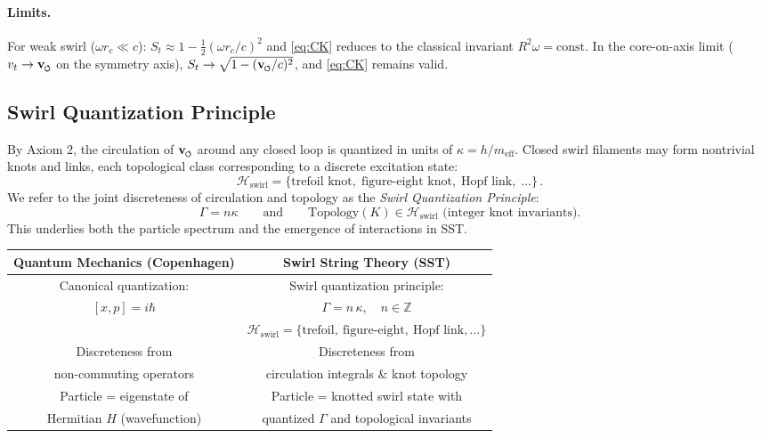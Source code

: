 \documentclass[11pt]{article}
\begin{document}
\paragraph{Limits.}
    For weak swirl ($\omega r_c\ll c$): $S_t \approx 1-\tfrac{1}{2}(\omega r_c/c)^2$ and \eqref{eq:CK} reduces to the classical invariant $R^2\omega=\text{const}$. In the core-on-axis limit ($v_t\to\vswirl$ on the symmetry axis), $S_t \to \sqrt{1-(\vswirl/c)^2}$, and \eqref{eq:CK} remains valid.

\subsection{Swirl Quantization Principle}
\label{sec:swirl_quantization}
By Axiom 2, the circulation of $\vswirl$ around any closed loop is quantized in units of $\kappa=h/m_{\text{eff}}$. Closed swirl filaments may form nontrivial knots and links, each topological class corresponding to a discrete excitation state:
\begin{equation}
\mathcal{H}_{\text{swirl}} = \{\text{trefoil knot},\; \text{figure-eight knot},\; \text{Hopf link},\;\dots\}\,.
\end{equation}
We refer to the joint discreteness of circulation and topology as the \emph{Swirl Quantization Principle}:
\[
    \Gamma = n\kappa \qquad \text{and} \qquad \text{Topology}(K)\in \mathcal{H}_{\text{swirl}} \text{ (integer knot invariants)}.
\]
This underlies both the particle spectrum and the emergence of interactions in SST.

\begin{center}\setlength{\tabcolsep}{5pt}
\begin{tabular}{|c|c|}
\hline
\textbf{Quantum Mechanics (Copenhagen)} & \textbf{Swirl String Theory (SST)} \\
\hline
Canonical quantization: & Swirl quantization principle: \\
$[x, p] = i \hbar$ & $\displaystyle \Gamma = n\,\kappa,\quad n\in\mathbb{Z}$ \\[6pt]
& $\displaystyle \mathcal{H}_{\text{swirl}} = \{\text{trefoil},\ \text{figure-eight},\ \text{Hopf link},\dots\}$ \\
\hline
Discreteness from & Discreteness from \\
non-commuting operators & circulation integrals \& knot topology \\
\hline
Particle = eigenstate of & Particle = knotted swirl state with \\
Hermitian $H$ (wavefunction) & quantized $\Gamma$ and topological invariants \\
\hline
\end{tabular}
\end{center}
\end{document}
